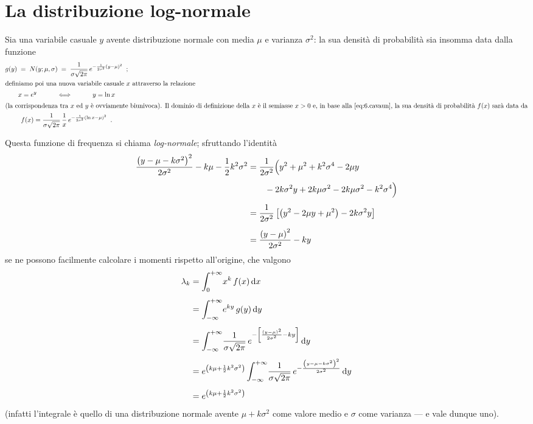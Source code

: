 \section{La distribuzione log-normale}%
Sia una variabile casuale $y$ avente distribuzione normale
con media $\mu$ e varianza $\sigma^2$: la sua densit\`a di
probabilit\`a sia insomma data dalla funzione
\begin{gather*}
  g(y) \; = \; N(y; \mu, \sigma) \; = \; \frac{1}{\sigma
    \sqrt{2\pi}} \, e^{- \frac{1}{2 \sigma^2} \left( y - \mu
    \right)^2 } \peq ; \\
  \intertext{definiamo poi una nuova variabile casuale $x$
    attraverso la relazione}
  x = e^y \makebox[30mm]{$\Longleftrightarrow$} y = \ln x \\
  \intertext{(la corrispondenza tra $x$ ed $y$ \`e
    ovviamente biunivoca).  Il dominio di definizione della
    $x$ \`e il semiasse $x > 0$ e, in base alla
    \eqref{eq:6.cavaun}, la sua densit\`a di probabilit\`a
    $f(x)$ sar\`a data da}
  f(x) = \frac{1}{\sigma \sqrt{2\pi}} \, \frac{1}{x} \, e^{-
    \frac{1}{2 \sigma^2} \left( \ln x - \mu \right)^2 } \peq
  .
\end{gather*}

Questa funzione di frequenza si chiama \emph{log-normale};
sfruttando l'identit\`a
\begin{align*}
  \frac{\left( y - \mu - k \sigma^2 \right)^2}{2 \sigma^2} -
  k \mu - \frac{1}{2} k^2 \sigma^2 &= \frac{1}{2 \sigma^2}
  \Bigl( y^2 + \mu^2 + k^2 \sigma^4 - 2 \mu y \\[1ex]
  & \qquad  - 2 k \sigma^2 y + 2 k \mu \sigma^2 - 2 k \mu
  \sigma^2 - k^2 \sigma^4 \Bigr) \\[1ex]
  &= \frac{1}{2 \sigma^2} \left[ \left( y^2 - 2 \mu y +
      \mu^2 \right) - 2 k \sigma^2 y \right] \\[1ex]
  &= \frac{\left( y - \mu \right)^2}{2 \sigma^2} - k y
\end{align*}
se ne possono facilmente calcolare i momenti rispetto
all'origine, che valgono
\begin{align*}
  \lambda_k &= \int_0^{+\infty} \! x^k \, f(x) \, \mathrm{d} x
  \\[1ex]
  &= \int_{-\infty}^{+\infty} \! e^{k y} \, g(y) \, \mathrm{d} y
  \\[1ex]
  &= \int_{-\infty}^{+\infty} \! \frac{1}{\sigma \sqrt{2
      \pi}} \, e^{- \left[ \frac{\left( y - \mu \right)^2}{2
      \sigma^2} - k y \right]} \, \mathrm{d} y \\[1ex]
  &= e^{\left( k \mu + \frac{1}{2} k^2 \sigma^2 \right)}
  \int_{-\infty}^{+\infty} \! \frac{1}{\sigma \sqrt{2 \pi}}
  \, e^{- \frac{\left( y - \mu - k \sigma^2 \right)^2}{2
      \sigma^2}} \, \mathrm{d} y \\[1ex]
  &= e^{\left( k \mu + \frac{1}{2} k^2 \sigma^2 \right)}
\end{align*}
(infatti l'integrale \`e quello di una distribuzione normale
avente $\mu + k \sigma^2$ come valore medio e $\sigma$ come
varianza --- e vale dunque uno).

